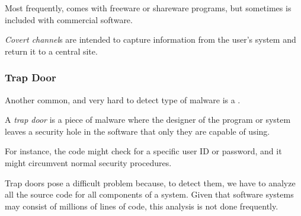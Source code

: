 Most frequently,  comes with freeware or shareware programs, but sometimes is included with commercial software.

\begin{definition}\label{def:Covert_Channel}
  \emph{Covert channel}s are intended to capture information from the user’s system and return it to a central site.
\end{definition}

\subsubsection{Trap Door}\label{subsubsec:Trap_Door}
Another common, and very hard to detect type of malware is a .
\begin{definition}\label{def:Trap_Door}
  A \emph{trap door} is a piece of malware where the designer of the program or system leaves a security hole in the software that only they are capable of using.
\end{definition}

For instance, the code might check for a specific user ID or password, and it might circumvent normal security procedures.

Trap doors pose a difficult problem because, to detect them, we have to analyze all the source code for all components of a system.
Given that software systems may consist of millions of lines of code, this analysis is not done frequently.


